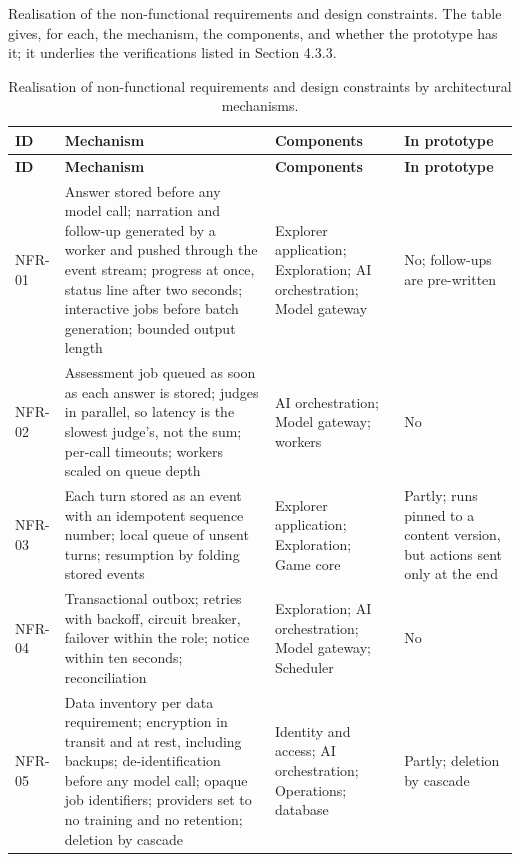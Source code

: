 Realisation of the non-functional requirements and design constraints. The table gives, for each, the mechanism, the components, and whether the prototype has it; it underlies the verifications listed in Section 4.3.3.

{\small
\begin{longtable}{|>{\raggedright\arraybackslash}p{}|>{\raggedright\arraybackslash}p{}|>{\raggedright\arraybackslash}p{}|>{\raggedright\arraybackslash}p{}|}
\caption{Realisation of non-functional requirements and design constraints by architectural mechanisms.} \\
\hline
\textbf{ID} & \textbf{Mechanism} & \textbf{Components} & \textbf{In prototype} \\ \hline
\endfirsthead
\hline
\textbf{ID} & \textbf{Mechanism} & \textbf{Components} & \textbf{In prototype} \\ \hline
\endhead
NFR-01 & Answer stored before any model call; narration and follow-up generated by a worker and pushed through the event stream; progress at once, status line after two seconds; interactive jobs before batch generation; bounded output length & Explorer application; Exploration; AI orchestration; Model gateway & No; follow-ups are pre-written \\ \hline
NFR-02 & Assessment job queued as soon as each answer is stored; judges in parallel, so latency is the slowest judge's, not the sum; per-call timeouts; workers scaled on queue depth & AI orchestration; Model gateway; workers & No \\ \hline
NFR-03 & Each turn stored as an event with an idempotent sequence number; local queue of unsent turns; resumption by folding stored events & Explorer application; Exploration; Game core & Partly; runs pinned to a content version, but actions sent only at the end \\ \hline
NFR-04 & Transactional outbox; retries with backoff, circuit breaker, failover within the role; notice within ten seconds; reconciliation & Exploration; AI orchestration; Model gateway; Scheduler & No \\ \hline
NFR-05 & Data inventory per data requirement; encryption in transit and at rest, including backups; de-identification before any model call; opaque job identifiers; providers set to no training and no retention; deletion by cascade & Identity and access; AI orchestration; Operations; database & Partly; deletion by cascade \\ \hline

\end{longtable}}
